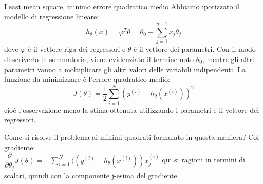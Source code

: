 \documentclass[10pt,a4paper]{article}
\begin{document}
Least mean square, minimo errore quadratico medio
Abbiamo ipotizzato il modello di regressione lineare:
\begin{equation}
h_\theta(x)=\varphi^T\theta=\theta_0+\sum_{j=1}^{p-1}x_j\theta_j
\end{equation}
dove $ \varphi $ è il vettore riga dei regressori e $ \theta $ è il vettore dei parametri.
Con il modo di scriverlo in sommatoria, viene evidenziato il termine noto $ \theta_0 $, mentre gli altri parametri vanno a moltiplicare gli altri valori delle variabili indipendenti.
La funzione da minimizzare è l'errore quadratico medio:
\begin{equation}
J(\theta)=\frac{1}{2} \sum_{i=1}^N(y^{(i)}-h_{\theta}(x^{(i)}))^2
\end{equation}
cioè l'osservazione meno la stima ottenuta utilizzando i parametri e il vettore dei regressori.

Come si risolve il problema ai minimi quadrati formulato in questa maniera?
Col gradiente:\\
$ \dfrac{\partial}{\partial \theta_j}J(\theta)=-\sum_{i=1}^N((y^{(i)}-h_\theta (x^{(i)}))x_j^{(i)} $
qui si ragioni in termini di scalari, quindi con la componente j-esima del gradiente
\end{document}
